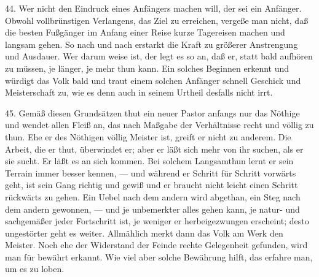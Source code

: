 44. Wer nicht den Eindruck eines Anfängers machen will, der sei ein Anfänger. Obwohl vollbrünstigen Verlangens, das Ziel zu erreichen, vergeße man
nicht, daß die besten Fußgänger im Anfang einer Reise kurze Tagereisen machen und langsam gehen. So nach und nach erstarkt die Kraft zu größerer Anstrengung und Ausdauer. Wer darum weise ist, der legt es so an, daß er, statt bald aufhören zu müssen, je länger, je mehr thun kann. Ein solches Beginnen erkennt und würdigt das Volk bald und traut einem solchen Anfänger schnell Geschick und Meisterschaft zu, wie es denn auch in seinem Urtheil desfalls nicht irrt.

45. Gemäß diesen Grundsätzen thut ein neuer Pastor anfangs nur das Nöthige und wendet allen Fleiß an, das nach Maßgabe der Verhältnisse recht und völlig zu thun. Ehe er des Nöthigen völlig Meister ist, greift er nicht zu anderem. Die Arbeit, die er thut, überwindet er; aber er läßt sich mehr von ihr suchen, als er sie sucht. Er läßt es an sich kommen. Bei solchem Langsamthun lernt er sein Terrain immer besser kennen, — und während er Schritt für Schritt vorwärts geht, ist sein Gang richtig und gewiß und er braucht nicht leicht einen Schritt rückwärts zu gehen. Ein Uebel nach dem andern wird abgethan, ein Steg nach dem andern gewonnen, — und je unbemerkter alles gehen kann, je natur- und sachgemäßer jeder Fortschritt ist, je weniger er herbeigezwungen erscheint; desto ungestörter geht es weiter. Allmählich merkt dann das Volk am Werk den Meister. Noch ehe der Widerstand der Feinde rechte Gelegenheit gefunden, wird man für bewährt erkannt. Wie viel aber solche Bewährung hilft, das erfahre man, um es zu loben.

